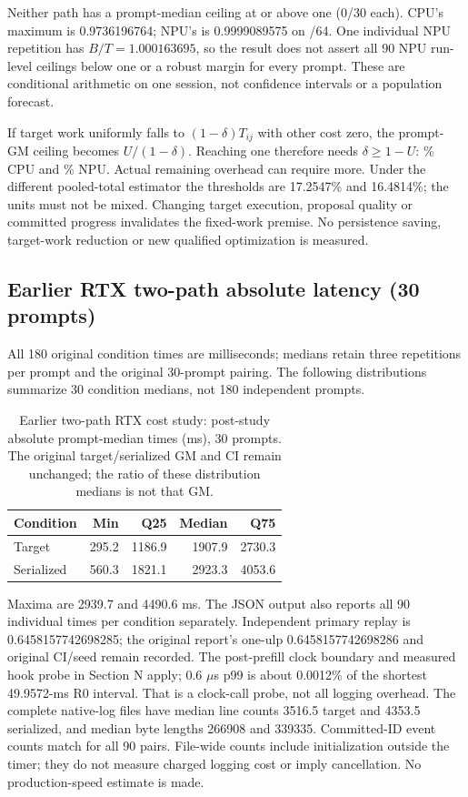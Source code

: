 Neither path has a prompt-median ceiling at or above one (0/30 each). CPU's maximum is 0.9736196764; NPU's is 0.9999089575 on /64. One individual NPU repetition has $B/T=1.000163695$, so the result does not assert all 90 NPU run-level ceilings below one or a robust margin for every prompt. These are conditional arithmetic on one session, not confidence intervals or a population forecast.

If target work uniformly falls to $(1-\delta)T_{ij}$ with other cost zero, the prompt-GM ceiling becomes $U/(1-\delta)$. Reaching one therefore needs $\delta\ge1-U$: \DiagCPUReduction\% CPU and \DiagNPUReduction\% NPU. Actual remaining overhead can require more. Under the different pooled-total estimator the thresholds are 17.2547\% and 16.4814\%; the units must not be mixed. Changing target execution, proposal quality or committed progress invalidates the fixed-work premise. No persistence saving, target-work reduction or new qualified optimization is measured.

\subsection{Earlier RTX two-path absolute latency (30 prompts)}
All 180 original condition times are milliseconds; medians retain three repetitions per prompt and the original 30-prompt pairing. The following distributions summarize 30 condition medians, not 180 independent prompts.
\begin{table}[t]
\caption{Earlier two-path RTX cost study: post-study absolute prompt-median times (ms), 30 prompts. The original target/serialized GM and CI remain unchanged; the ratio of these distribution medians is not that GM.}
\label{tab:rtxabsolutetime}
\centering
\begin{tabular}{lrrrr}
\toprule
Condition & Min & Q25 & Median & Q75 \\
\midrule
Target & 295.2 & 1186.9 & 1907.9 & 2730.3 \\
Serialized & 560.3 & 1821.1 & 2923.3 & 4053.6 \\
\bottomrule
\end{tabular}
\end{table}
Maxima are 2939.7 and 4490.6 ms. The JSON output also reports all 90 individual times per condition separately. Independent primary replay is 0.6458157742698285; the original report's one-ulp 0.6458157742698286 and original CI/seed remain recorded. The post-prefill clock boundary and measured hook probe in Section N apply; 0.6 $\mu$s p99 is about 0.0012\% of the shortest 49.9572-ms R0 interval. That is a clock-call probe, not all logging overhead. The complete native-log files have median line counts 3516.5 target and 4353.5 serialized, and median byte lengths 266908 and 339335. Committed-ID event counts match for all 90 pairs. File-wide counts include initialization outside the timer; they do not measure charged logging cost or imply cancellation. No production-speed estimate is made.
